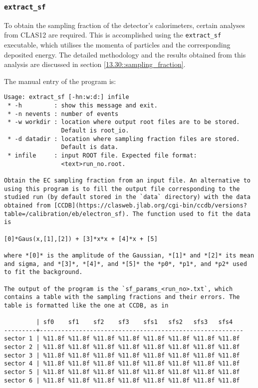 \subsubsection{\texttt{extract\_sf}}
\label{13.12::extract_sf}
    To obtain the sampling fraction of the detector's calorimeters, certain analyses from CLAS12 are required.
    This is accomplished using the \texttt{extract\_sf} executable, which utilises the momenta of particles and the corresponding deposited energy.
    The detailed methodology and the results obtained from this analysis are discussed in section \ref{13.30::sampling_fraction}.

    The manual entry of the program is:
    \begin{lstlisting}
Usage: extract_sf [-hn:w:d:] infile
 * -h         : show this message and exit.
 * -n nevents : number of events
 * -w workdir : location where output root files are to be stored.
                Default is root_io.
 * -d datadir : location where sampling fraction files are stored.
                Default is data.
 * infile     : input ROOT file. Expected file format:
                <text>run_no.root.

Obtain the EC sampling fraction from an input file. An alternative to using this program is to fill the output file corresponding to the studied run (by default stored in the `data` directory) with the data obtained from [CCDB](https://clasweb.jlab.org/cgi-bin/ccdb/versions?table=/calibration/eb/electron_sf). The function used to fit the data is

[0]*Gaus(x,[1],[2]) + [3]*x*x + [4]*x + [5]

where *[0]* is the amplitude of the Gaussian, *[1]* and *[2]* its mean and sigma, and *[3]*, *[4]*, and *[5]* the *p0*, *p1*, and *p2* used to fit the background.

The output of the program is the `sf_params_<run_no>.txt`, which contains a table with the sampling fractions and their errors. The table is formatted like the one at CCDB, as in

         | sf0    sf1    sf2    sf3    sfs1   sfs2   sfs3   sfs4
---------+---------------------------------------------------------
sector 1 | %11.8f %11.8f %11.8f %11.8f %11.8f %11.8f %11.8f %11.8f
sector 2 | %11.8f %11.8f %11.8f %11.8f %11.8f %11.8f %11.8f %11.8f
sector 3 | %11.8f %11.8f %11.8f %11.8f %11.8f %11.8f %11.8f %11.8f
sector 4 | %11.8f %11.8f %11.8f %11.8f %11.8f %11.8f %11.8f %11.8f
sector 5 | %11.8f %11.8f %11.8f %11.8f %11.8f %11.8f %11.8f %11.8f
sector 6 | %11.8f %11.8f %11.8f %11.8f %11.8f %11.8f %11.8f %11.8f
    \end{lstlisting}
